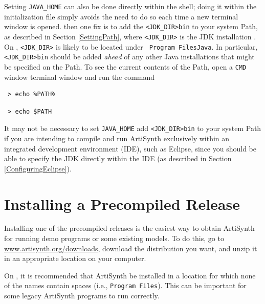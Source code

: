 Setting {\tt JAVA\_HOME} can also be done directly within the shell;
doing it within the initialization file simply avoids the need to do
so each time a new terminal window is opened.
\else %
then one fix is to add the \directory{} {\tt <JDK\_DIR>\SEP bin} to
your system Path, as described in Section \ref{SettingPath}, where
{\tt <JDK\_DIR>} is the JDK installation \directory{}. 
\ifWindows
On \SYSTEM{}, {\tt <JDK\_DIR>} is likely to be located under {\tt
Program Files\SEP Java}.
\fi
In particular, {\tt <JDK\_DIR>\SEP bin} should be added {\it ahead} of
any other Java installations that might be specified on the Path. To
see the current contents of the Path, open a
\ifWindows
{\tt CMD} window
\else
terminal window
\fi
and run the command
\ifWindows
\begin{verbatim}
 > echo %PATH%
\end{verbatim}
\else
\begin{verbatim}
 > echo $PATH
\end{verbatim}
\fi
\fi %

\begin{sideblock}
It may not be necessary to 
\ifMacOS
set {\tt JAVA\_HOME}
\else
add {\tt <JDK\_DIR>\SEP bin} to your system Path
\fi
if you are intending to compile and run ArtiSynth exclusively
within an integrated development environment (IDE), such as Eclipse,
since you should be able to specify the JDK directly within the IDE
(as described in Section \ref{ConfiguringEclipse}).
\end{sideblock}

\section{Installing a Precompiled Release}
\label{PrecompiledRelease}

Installing one of the precompiled releases is the easiest way to
obtain ArtiSynth for running demo programs or some existing models.
To do this, go to \href{http://www.artisynth.org/downloads}%
{www.artisynth.org/downloads}, download the distribution you want, and
unzip it in an appropriate location on your computer.

\ifWindows
\begin{sideblock}
On \SYSTEM{}, it is recommended that ArtiSynth be
installed in a location for which none of the \directory{} names
contain spaces (i.e., {\tt Program Files}).  This can be important for
some legacy ArtiSynth programs to run correctly.
\end{sideblock}
\else\fi %

